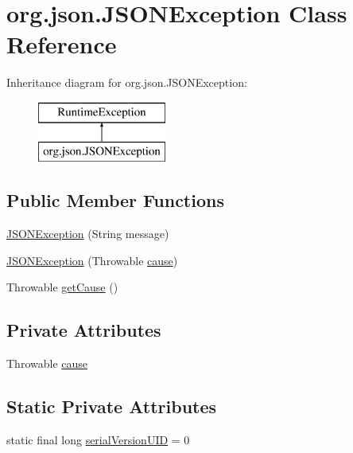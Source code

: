\hypertarget{classorg_1_1json_1_1_j_s_o_n_exception}{\section{org.\-json.\-J\-S\-O\-N\-Exception Class Reference}
\label{classorg_1_1json_1_1_j_s_o_n_exception}
}
Inheritance diagram for org.\-json.\-J\-S\-O\-N\-Exception\-:\begin{figure}[H]
\begin{center}
\leavevmode
\includegraphics[height=2.000000cm]{classorg_1_1json_1_1_j_s_o_n_exception}
\end{center}
\end{figure}
\subsection*{Public Member Functions}
\begin{DoxyCompactItemize}
\item 
\hyperlink{classorg_1_1json_1_1_j_s_o_n_exception_a8251c83531dd05241eeddcd2eed31bae}{J\-S\-O\-N\-Exception} (String message)
\item 
\hyperlink{classorg_1_1json_1_1_j_s_o_n_exception_aa09b706ee690c9a2a4e96b93d64dff9b}{J\-S\-O\-N\-Exception} (Throwable \hyperlink{classorg_1_1json_1_1_j_s_o_n_exception_adfaad5c0b7a1d41430d2d1e701520e2b}{cause})
\item 
Throwable \hyperlink{classorg_1_1json_1_1_j_s_o_n_exception_a3215d707756f45b63a71728aebf7b918}{get\-Cause} ()
\end{DoxyCompactItemize}
\subsection*{Private Attributes}
\begin{DoxyCompactItemize}
\item 
Throwable \hyperlink{classorg_1_1json_1_1_j_s_o_n_exception_adfaad5c0b7a1d41430d2d1e701520e2b}{cause}
\end{DoxyCompactItemize}
\subsection*{Static Private Attributes}
\begin{DoxyCompactItemize}
\item 
static final long \hyperlink{classorg_1_1json_1_1_j_s_o_n_exception_afdd64d3f1a75f497c8641f02a49201c9}{serial\-Version\-U\-I\-D} = 0
\end{DoxyCompactItemize}


